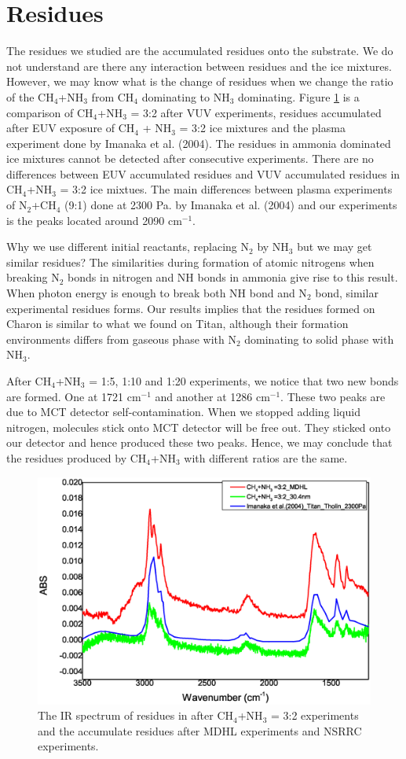 \section{Residues}
The residues we studied are the accumulated residues onto the substrate. We do not understand are there any interaction between residues and the ice mixtures. However, we may know what is the change of residues when we change the ratio of the CH$_4$+NH$_3$ from CH$_4$ dominating to NH$_3$ dominating.  Figure \ref{fig:residues} is a comparison of CH$_4$+NH$_3$ = 3:2 after VUV experiments, residues accumulated after EUV exposure of CH$_4$ + NH$_3$ = 3:2 ice mixtures and the plasma experiment done by Imanaka et al. (2004)\cite{imanaka2004laboratory}. The residues in ammonia dominated ice mixtures cannot be detected after consecutive experiments. There are no differences between EUV accumulated residues and VUV accumulated residues in CH$_4$+NH$_3$ = 3:2 ice mixtues. The main differences between plasma experiments of N$_2$+CH$_4$ (9:1) done at 2300 Pa. by Imanaka et al. (2004)\cite{imanaka2004laboratory} and our experiments is the peaks located around 2090 cm$^{-1}$.

Why we use different initial reactants, replacing N$_2$ by NH$_3$ but we may get similar residues? The similarities during formation of atomic nitrogens when breaking N$_2$ bonds in nitrogen and NH bonds in ammonia give rise to this result. When photon energy is enough to break both NH bond and N$_2$ bond, similar experimental residues forms. Our results implies that the residues formed on Charon is similar to what we found on Titan, although their formation environments differs from gaseous phase with N$_2$ dominating to solid phase with NH$_3$.

After CH$_4$+NH$_3$ = 1:5, 1:10 and 1:20 experiments, we notice that two new bonds are formed. One at 1721 cm$^{-1}$ and another at 1286 cm$^{-1}$. These two peaks are due to MCT detector self-contamination. When we stopped adding liquid nitrogen, molecules stick onto MCT detector will be free out. They sticked onto our detector and hence produced these two peaks. Hence, we may conclude that the residues produced by CH$_4$+NH$_3$ with different ratios are the same.

\begin{figure}
\centering
\includegraphics[width=\textwidth]{figures/chapter3/residue.eps}
\caption{The IR spectrum of residues in after CH$_4$+NH$_3$ = 3:2 experiments and the accumulate residues after MDHL experiments and NSRRC experiments.}
\label{fig:residues}
\end{figure}

